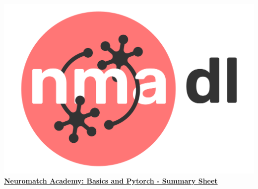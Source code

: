 \includegraphics[scale=0.03]{Figures/NMADL.png}\href{https://compneuro.neuromatch.io/tutorials/intro.html}{\textbf{\Huge{Neuromatch Academy: Basics and Pytorch - Summary Sheet}}}
\small
